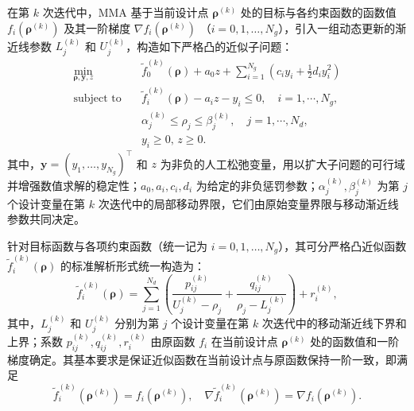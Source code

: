 在第 $k$ 次迭代中，MMA 基于当前设计点 $\boldsymbol{\rho}^{(k)}$ 处的目标与各约束函数的函数值 $f_i(\boldsymbol{\rho}^{(k)})$ 及其一阶梯度 $\nabla f_i(\boldsymbol{\rho}^{(k)})$ （$i=0,1,\dots,N_g$），引入一组动态更新的渐近线参数 $L_j^{(k)}$ 和 $U_j^{(k)}$，构造如下严格凸的近似子问题：
\begin{equation} \label{eq:ch2_mma_subproblem}
	\begin{aligned}
		\min_{\boldsymbol{\rho},\boldsymbol{y}, z}\quad&\tilde{f}_0^{(k)}(\boldsymbol{\rho}) + a_0z + \sum_{i=1}^{N_g}\left(c_iy_i+\frac{1}{2}d_iy_i^2\right)\\
		\text{subject to}\quad&\tilde{f}_i^{(k)}(\boldsymbol{\rho}) - a_iz - y_i \leq 0, \quad i=1,\cdots,N_g,\\
		&\alpha_j^{(k)}\leq\rho_j\leq\beta_j^{(k)}, \quad j=1,\cdots,N_d,\\
		&y_i\geq 0, \, z\geq 0.
	\end{aligned}
\end{equation}
其中，$\boldsymbol{y}=(y_1,\dots,y_{N_g})^\top$ 和 $z$ 为非负的人工松弛变量，用以扩大子问题的可行域并增强数值求解的稳定性；$a_0,a_i,c_i,d_i$ 为给定的非负惩罚参数；$\alpha_j^{(k)},\beta_j^{(k)}$ 为第 $j$ 个设计变量在第 $k$ 次迭代中的局部移动界限，它们由原始变量界限与移动渐近线参数共同决定。

针对目标函数与各项约束函数（统一记为 $i = 0, 1, \dots, N_g$），其可分严格凸近似函数 $\tilde{f}_i^{(k)}(\boldsymbol{\rho})$ 的标准解析形式统一构造为：
\begin{equation} \label{eq:ch2_mma_approximation}
	\tilde{f}_i^{(k)}(\boldsymbol{\rho}) = \sum_{j=1}^{N_d}\left(\frac{p_{ij}^{(k)}}{U_{j}^{(k)}-\rho_j} + \frac{q_{ij}^{(k)}}{\rho_{j}-L_j^{(k)}}\right) + r_i^{(k)},
\end{equation}
其中，$L_j^{(k)}$ 和 $U_j^{(k)}$ 分别为第 $j$ 个设计变量在第 $k$ 次迭代中的移动渐近线下界和上界；系数 $p_{ij}^{(k)}, q_{ij}^{(k)}, r_i^{(k)}$ 由原函数 $f_i$ 在当前设计点 $\boldsymbol{\rho}^{(k)}$ 处的函数值和一阶梯度确定。其基本要求是保证近似函数在当前设计点与原函数保持一阶一致，即满足
\[
\tilde{f}_i^{(k)}(\boldsymbol{\rho}^{(k)}) = f_i(\boldsymbol{\rho}^{(k)}),\quad\nabla\tilde{f}_i^{(k)}(\boldsymbol{\rho}^{(k)}) = \nabla f_i(\boldsymbol{\rho}^{(k)}).
\]

